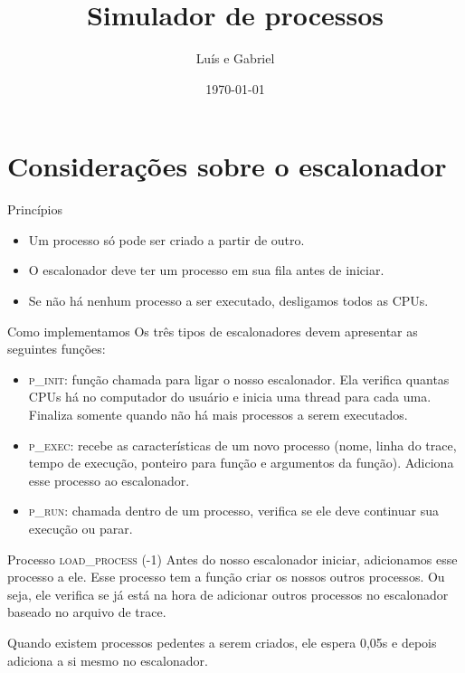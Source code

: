 \documentclass{beamer}
\title{Simulador de processos}
\date{\today}
\author{Luís e Gabriel}
\institute{Centre for Modern Beamer Themes}
\begin{document}
\maketitle

\section{Considerações sobre o escalonador}
\begin{frame}{Princípios}
	\begin{itemize}
		\item Um processo só pode ser criado a partir de outro.
		\item O escalonador deve ter um processo em sua fila antes de iniciar.
		\item Se não há nenhum processo a ser executado, desligamos todos as CPUs.
	\end{itemize}
\end{frame}


\begin{frame}{Como implementamos}
	Os três tipos de escalonadores devem apresentar as seguintes funções:
	\begin{itemize}
		\item \textsc{p\_init}: função chamada para ligar o nosso escalonador. Ela verifica quantas CPUs há no computador do usuário e inicia uma thread para cada uma. Finaliza somente quando não há mais processos a serem executados.
		\item \textsc{p\_exec}: recebe as características de um novo processo (nome, linha do trace, tempo de execução, ponteiro para função e argumentos da função). Adiciona esse processo ao escalonador.
		\item \textsc{p\_run}: chamada dentro de um processo, verifica se ele deve continuar sua execução ou parar.
	\end{itemize}
\end{frame}


\begin{frame}{Processo \textsc{load\_process} (-1)}
	\justifying
	Antes do nosso escalonador iniciar, adicionamos esse processo a ele. Esse processo tem a função criar os nossos outros processos. Ou seja, ele verifica se já está na hora de adicionar outros processos no escalonador baseado no arquivo de trace. 
	
	Quando existem processos pedentes a serem criados, ele espera 0,05s e depois adiciona a si mesmo no escalonador. 
\end{frame}
\end{document}
